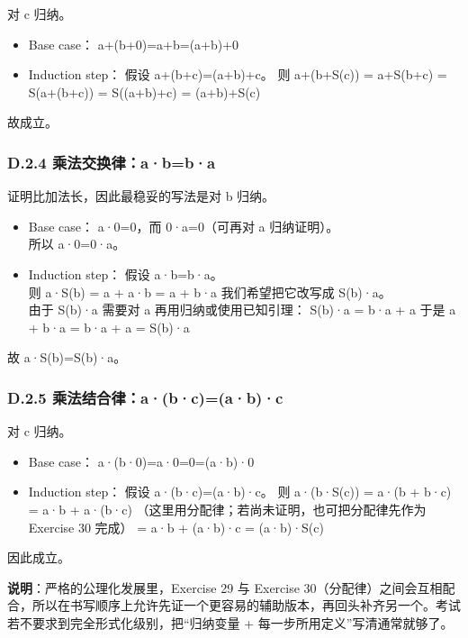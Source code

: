 \documentclass[
  11pt,
]{article}
\begin{document}
对 c 归纳。

\begin{itemize}
\item
  Base case： a+(b+0)=a+b=(a+b)+0
\item
  Induction step： 假设 a+(b+c)=(a+b)+c。 则 a+(b+S(c)) = a+S(b+c) =
  S(a+(b+c)) = S((a+b)+c) = (a+b)+S(c)
\end{itemize}

故成立。

\subsubsection{D.2.4
乘法交换律：a·b=b·a}\label{d.2.4-ux4e58ux6cd5ux4ea4ux6362ux5f8babba}

证明比加法长，因此最稳妥的写法是对 b 归纳。

\begin{itemize}
\item
  Base case： a·0=0，而 0·a=0（可再对 a 归纳证明）。\\
  所以 a·0=0·a。
\item
  Induction step： 假设 a·b=b·a。\\
  则 a·S(b) = a + a·b = a + b·a 我们希望把它改写成 S(b)·a。\\
  由于 S(b)·a 需要对 a 再用归纳或使用已知引理： S(b)·a = b·a + a 于是 a
  + b·a = b·a + a = S(b)·a
\end{itemize}

故 a·S(b)=S(b)·a。

\subsubsection{D.2.5
乘法结合律：a·(b·c)=(a·b)·c}\label{d.2.5-ux4e58ux6cd5ux7ed3ux5408ux5f8babcabc}

对 c 归纳。

\begin{itemize}
\item
  Base case： a·(b·0)=a·0=0=(a·b)·0
\item
  Induction step： 假设 a·(b·c)=(a·b)·c。 则 a·(b·S(c)) = a·(b + b·c) =
  a·b + a·(b·c) （这里用分配律；若尚未证明，也可把分配律先作为 Exercise
  30 完成） = a·b + (a·b)·c = (a·b)·S(c)
\end{itemize}

因此成立。

\textbf{说明}：严格的公理化发展里，Exercise 29 与 Exercise
30（分配律）之间会互相配合，所以在书写顺序上允许先证一个更容易的辅助版本，再回头补齐另一个。考试若不要求到完全形式化级别，把``归纳变量
+ 每一步所用定义''写清通常就够了。
\end{document}
